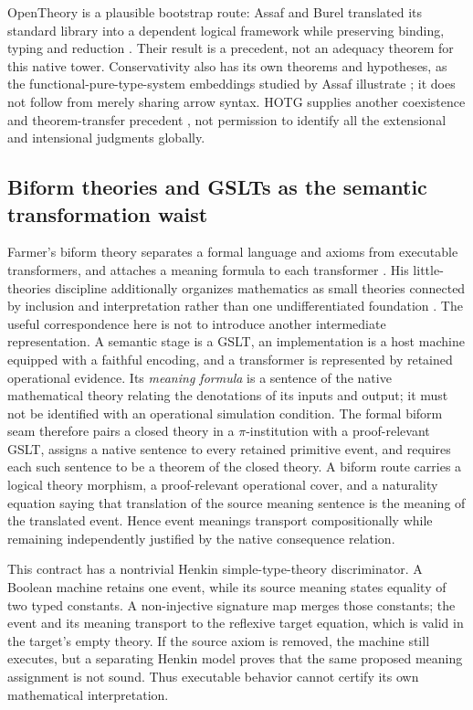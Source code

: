 \documentclass[11pt]{article}
\theoremstyle{definition}
\theoremstyle{remark}
\begin{document}
OpenTheory is a plausible bootstrap route: Assaf and Burel translated its
standard library into a dependent logical framework while preserving binding,
typing and reduction \cite{AssafBurelHOL}. Their result is a precedent, not
an adequacy theorem for this native tower. Conservativity also has its own
theorems and hypotheses, as the functional-pure-type-system embeddings studied
by Assaf illustrate \cite{AssafConservativity}; it does not follow from merely
sharing arrow syntax. HOTG supplies another coexistence and theorem-transfer
precedent \cite{BrownKaliszykPakHOTG}, not permission to identify all the
extensional and intensional judgments globally.

\subsection{Biform theories and GSLTs as the semantic transformation waist}

Farmer's biform theory separates a formal language and axioms from executable
transformers, and attaches a meaning formula to each transformer
\cite{CaretteFarmerSharodaBiform,FarmerMohrenschildtTransformers}.  His
little-theories discipline additionally organizes mathematics as small theories
connected by inclusion and interpretation rather than one undifferentiated
foundation \cite{FarmerLittleTheories}.  The useful
correspondence here is not to introduce another intermediate representation.
A semantic stage is a GSLT, an implementation is a host machine equipped with a
faithful encoding, and a transformer is represented by retained operational
evidence.  Its \emph{meaning formula} is a sentence of the native mathematical
theory relating the denotations of its inputs and output; it must not be
identified with an operational simulation condition.  The formal biform seam
therefore pairs a closed theory in a $\pi$-institution with a proof-relevant
GSLT, assigns a native sentence to every retained primitive event, and requires
each such sentence to be a theorem of the closed theory.  A biform route carries
a logical theory morphism, a proof-relevant operational cover, and a naturality
equation saying that translation of the source meaning sentence is the meaning
of the translated event.  Hence event meanings transport compositionally while
remaining independently justified by the native consequence relation.

This contract has a nontrivial Henkin simple-type-theory discriminator.  A
Boolean machine retains one event, while its source meaning states equality of
two typed constants.  A non-injective signature map merges those constants; the
event and its meaning transport to the reflexive target equation, which is
valid in the target's empty theory.  If the source axiom is removed, the machine
still executes, but a separating Henkin model
proves that the same proposed meaning assignment is not sound.  Thus executable
behavior cannot certify its own mathematical interpretation.
\end{document}
